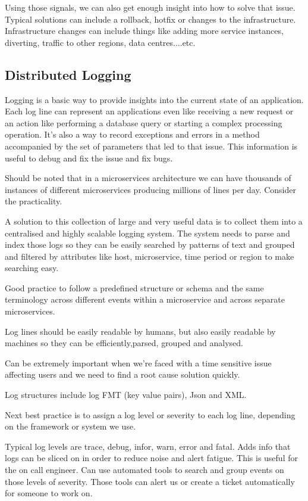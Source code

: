 \documentclass[a4paper, 11pt]{book}
\begin{document}
    Using those signals, we can also get enough insight into how to solve that issue.
    Typical solutions can include a rollback, hotfix or changes to the infrastructure.
    Infrastructure changes can include things like adding more service instances, diverting, traffic to other regions, data centres....etc.

    \subsection{Distributed Logging}

    Logging is a basic way to provide insights into the current state of an application.
    Each log line can represent an applications even like receiving a new request or an action like performing a database query or starting a complex processing operation.
    It's also a way to record exceptions and errors in a method accompanied by the set of parameters that led to that issue.
    This information is useful to debug and fix the issue and fix bugs.

    Should be noted that in a microservices architecture we can have thousands of instances of different microservices producing millions of lines per day.
    Consider the practicality.

    A solution to this collection of large and very useful data is to collect them into a centralised and highly scalable logging system.
    The system needs to parse and index those logs so they can be easily searched by patterns of text and grouped and filtered by attributes like host, microservice, time period or region to make searching easy.

    Good practice to follow a predefined structure or schema and the same terminology across different events within a microservice and across separate microservices.

    Log lines should be easily readable by humans, but also easily readable by machines so they can be efficiently,parsed, grouped and analysed.

    Can be extremely important when we're faced with a time sensitive issue affecting users and we need to find a root cause solution quickly.

    Log structures include log FMT (key value pairs), Json and XML.

    Next best practice is to assign a log level or severity to each log line, depending on the framework or system we use.

    Typical log levels are trace, debug, infor, warn, error and fatal.
    Adds info that logs can be sliced on in order to reduce noise and alert fatigue.
    This is useful for the on call engineer.
    Can use automated tools to search and group events on those levels of severity.
    Those tools can alert us or create a ticket automatically for someone to work on.
\end{document}

